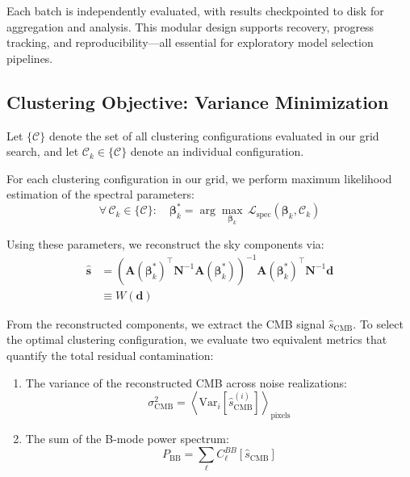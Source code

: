 \documentclass[fleqn,usenatbib]{mnras}
\begin{document}
Each batch is independently evaluated, with results checkpointed to disk for aggregation and analysis. This modular design supports recovery, progress tracking, and reproducibility—all essential for exploratory model selection pipelines.
\subsection{Clustering Objective: Variance Minimization}
\label{subsec:variance_minimization}

Let \(\{\mathcal{C}\}\) denote the set of all clustering configurations evaluated in our grid search, and let \(\mathcal{C}_k \in \{\mathcal{C}\}\) denote an individual configuration.

For each clustering configuration in our grid, we perform maximum likelihood estimation of the spectral parameters:
\begin{equation}
\label{eq:grid_search}
\forall\, \mathcal{C}_k \in \{\mathcal{C}\} : \quad \boldsymbol{\beta}_k^* = \arg \max_{\boldsymbol{\beta}_k} \, \mathcal{L}_{\mathrm{spec}}(\boldsymbol{\beta}_k, \mathcal{C}_k)
\end{equation}

Using these parameters, we reconstruct the sky components via:
\begin{align}
\hat{\mathbf{s}} &= \left( \mathbf{A}(\boldsymbol{\beta}_k^*)^\top \mathbf{N}^{-1} \mathbf{A}(\boldsymbol{\beta}_k^*) \right)^{-1} \mathbf{A}(\boldsymbol{\beta}_k^*)^\top \mathbf{N}^{-1} \mathbf{d} \label{eq:recon_operator} \\
&\equiv W(\mathbf{d})
\end{align}

From the reconstructed components, we extract the CMB signal \( \hat{s}_{\mathrm{CMB}} \). To select the optimal clustering configuration, we evaluate two equivalent metrics that quantify the total residual contamination:

\begin{enumerate}
    \item The variance of the reconstructed CMB across noise realizations:
    \begin{equation}
    \label{eq:min_var}
    \sigma^2_{\mathrm{CMB}} = \left\langle \mathrm{Var}_{i} \left[ \hat{s}^{(i)}_{\mathrm{CMB}} \right] \right\rangle_{\text{pixels}}
    \end{equation}
    
    \item The sum of the B-mode power spectrum:
    \begin{equation}
    P_{\mathrm{BB}} = \sum_{\ell} C_\ell^{BB}[\hat{s}_{\mathrm{CMB}}]
    \label{eq:sum_bb}
    \end{equation}
\end{enumerate}
\end{document}

